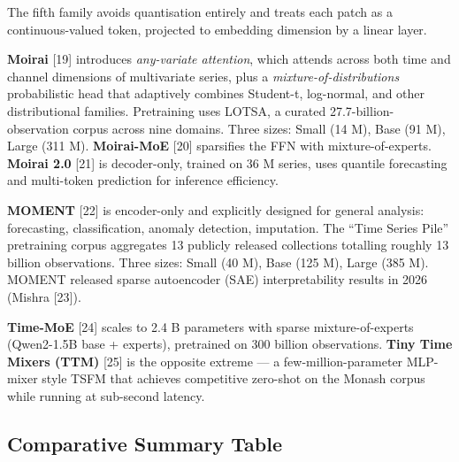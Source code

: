 \documentclass{article}
\begin{document}
The fifth family avoids quantisation entirely and treats each patch as a continuous-valued token, projected to embedding dimension by a linear layer.

\textbf{Moirai} \citep{woo2024unifiedtrainingofu} {[}19{]} introduces \emph{any-variate attention}, which attends across both time and channel dimensions of multivariate series, plus a \emph{mixture-of-distributions} probabilistic head that adaptively combines Student-t, log-normal, and other distributional families. Pretraining uses LOTSA, a curated 27.7-billion-observation corpus across nine domains. Three sizes: Small (14 M), Base (91 M), Large (311 M). \textbf{Moirai-MoE} \citep{liu2024itransformerinvert} {[}20{]} sparsifies the FFN with mixture-of-experts. \textbf{Moirai 2.0} \citep{liu2025calfaligningllmsfo} {[}21{]} is decoder-only, trained on 36 M series, uses quantile forecasting and multi-token prediction for inference efficiency.

\textbf{MOMENT} \citep{goswami2024momentafamilyofope} {[}22{]} is encoder-only and explicitly designed for general analysis: forecasting, classification, anomaly detection, imputation. The ``Time Series Pile'' pretraining corpus aggregates 13 publicly released collections totalling roughly 13 billion observations. Three sizes: Small (40 M), Base (125 M), Large (385 M). MOMENT released sparse autoencoder (SAE) interpretability results in 2026 (Mishra {[}23{]}).

\textbf{Time-MoE} \citep{shi2024timemoebillionscal} {[}24{]} scales to 2.4 B parameters with sparse mixture-of-experts (Qwen2-1.5B base + experts), pretrained on 300 billion observations. \textbf{Tiny Time Mixers (TTM)} \citep{ekambaram2024tinytimemixersttms} {[}25{]} is the opposite extreme --- a few-million-parameter MLP-mixer style TSFM that achieves competitive zero-shot on the Monash corpus while running at sub-second latency.

\subsection{Comparative Summary Table}\label{comparative-summary-table}
\end{document}
